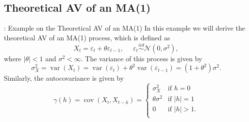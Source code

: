 \documentclass[envcountsect,usenames,dvipsnames]{beamer}
\DeclareMathOperator*{\cov}{cov}
\DeclareMathOperator*{\var}{var}
\def\simiid{\stackrel{iid}{\sim}}
\theoremstyle{mystyle}
\begin{document}
\subsection{Theoretical AV of an MA(1)}
\label{ex:ma:av:theo}

\begin{frame}{\thesubsection: Example on the Theoretical AV of an MA(1)} 
    In this example we will derive the theoretical AV of an MA(1) process, which is defined as
    \begin{equation*}
        X_t = \varepsilon_t + \theta \varepsilon_{t-1}, \;\;\;\;\; \varepsilon_t \simiid \mathcal{N}(0, \sigma^2),
    \end{equation*}
    where $|\theta| < 1$ and $\sigma^2 < \infty$. The variance of this process is given by
    \begin{equation*}
        \sigma^2_X = \var \left( X_t \right) = \var \left( \varepsilon_t \right) + \theta^2 \var \left( \varepsilon_{t-1} \right) = \left(1 + \theta^2 \right) \sigma^2.
    \end{equation*}
    Similarly, the autocovariance is given by
    \begin{equation*}
        \gamma(h) = \cov\left(X_t, X_{t-h} \right) =\left\{
  \begin{array}{cl}
    \sigma^2_X &\text{if } h = 0\\
    \theta \sigma^2 &\text{if } |h| = 1\\
    0 &\text{if } |h| > 1.\\
  \end{array}
\right.
    \end{equation*}
\end{frame}
\end{document}
